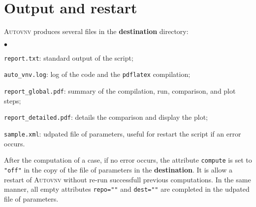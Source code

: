 \documentclass[a4paper,10pt,twoside]{csshortdoc}
\begin{document}
\section{Output and restart}\label{sec:restart}

\textsc{Autovnv} produces several files in the \textbf{destination} directory:
\begin{list}{$\bullet$}{}
\item \texttt{report.txt}: standard output of the script;
\item \texttt{auto\_vnv.log}: log of the code and the \texttt{pdflatex}
compilation;
\item \texttt{report\_global.pdf}: summary of the compilation, run, comparison,
and plot steps;
\item \texttt{report\_detailed.pdf}: details the comparison and display the
plot;
\item \texttt{sample.xml}: udpated file of parameters, useful for restart the
script if an error occurs.
\end{list}

After the computation of a case, if no error occurs, the attribute
\texttt{compute} is set to \texttt{"off"} in the copy of the file of parameters
in the \textbf{destination}. It is allow a restart of \textsc{Autovnv} without
re-run successfull previous computations.
In the same manner, all empty attributes \texttt{repo=""} and \texttt{dest=""}
are completed in the udpated file of parameters.
\end{document}
